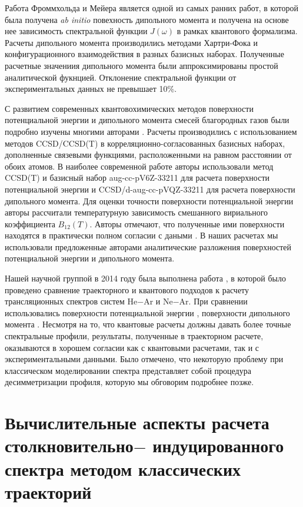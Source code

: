 Работа \cite{meyer1986} Фроммхольда и Мейера является одной из самых ранних работ, в которой была получена \textit{ab initio} повехность дипольного момента и получена на основе нее зависимость спектральной функции $J(\omega)$ в рамках квантового формализма. Расчеты дипольного момента производились методами Хартри-Фока и конфигурационного взаимодействия в разных базисных наборах. Полученные расчетные значениия дипольного момента были аппроксимированы простой аналитической фукнцией. Отклонение спектральной функции от экспериментальных данных не превышает 10\%. \par 
С развитием современных квантовохимических методов поверхности потенциальной энергии и дипольного момента смесей благородных газов были подробно изучены многими авторами \cite{cybulski1999, giece2003, fernandez2004}. Расчеты производились с использованием методов CCSD/CCSD(T) в корреляционно-согласованных базисных наборах, дополненные связевыми функциями, расположенными на равном расстоянии от обоих атомов. В наиболее современной работе\cite{fernandez2004} авторы использовали метод CCSD(T) и базисный набор aug-cc-pV6Z-33211 для расчета поверхности потенциальной энергии и CCSD/d-aug-cc-pVQZ-33211 для расчета поверхности дипольного момента. Для оценки точности поверхности потенциальной энергии авторы рассчитали температурную зависимость смешанного вириального коэффициента $B_{12}(T)$. Авторы отмечают, что полученные ими поверхности находятся в практически полном согласии с даными \cite{cybulski1999}. В наших расчетах мы использовали предложенные авторами аналитические разложения поверхностей потенциальной энергии и дипольного момента. \par
Нашей научной группой в 2014 году была выполнена работа \cite{buryak2014}, в которой было проведено сравнение траекторного и квантового подходов к расчету трансляционных спектров систем He$-$Ar и Ne$-$Ar. При сравнении использовались поверхности потенциальной энергии \cite{fernandez2004}, поверхности дипольного момента \cite{fernandez2004, meyer1986}. Несмотря на то, что квантовые расчеты должны давать более точные спектральные профили, результаты, полученные в траекторном расчете, оказываются в хорошем согласии как с квантовыми расчетами, так и с экспериментальными данными. Было отмечено, что некоторую проблему при классическом моделировании спектра представляет собой процедура десимметризации профиля, которую мы обговорим подробнее позже. \par

\section{Вычислительные аспекты расчета столкновительно$-$ индуцированного спектра методом классических траекторий}

